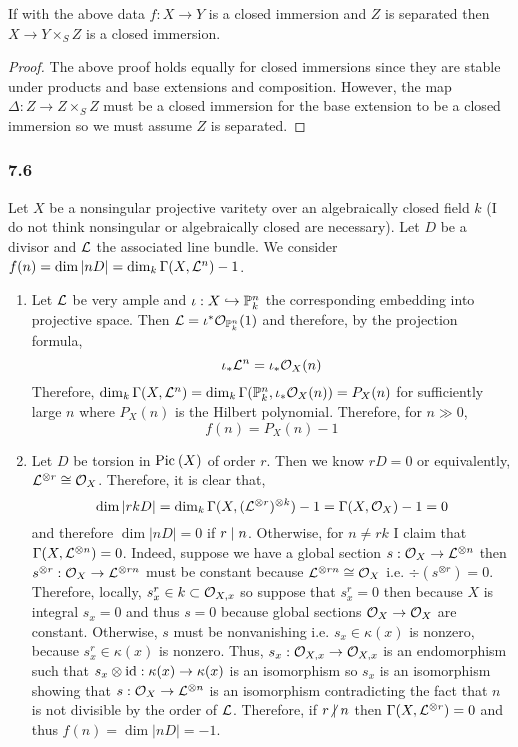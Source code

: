 \documentclass[12pt]{article}
\begin{document}
\begin{corollary}
If with the above data $f : X \to Y$ is a closed immersion and $Z$ is separated then $X \to Y \times_S Z$ is a closed immersion.
\end{corollary}

\begin{proof}
The above proof holds equally for closed immersions since they are stable under products and base extensions and composition. However, the map $\Delta : Z \to Z \times_S Z$ must be a closed immersion for the base extension to be a closed immersion so we must assume $Z$ is separated. 
\end{proof}

\subsubsection{7.6}

Let $X$ be a nonsingular projective varitety over an algebraically closed field $k$ (I do not think nonsingular or algebraically closed are necessary). Let $D$ be a divisor and $\mathcal{L}$ the associated line bundle. We consider $f(n) = \dim |n D| = \dim_k \Gamma(X, \mathcal{L}^n) - 1$.

\begin{enumerate}
\item Let $\mathcal{L}$ be very ample and $\iota : X \hookrightarrow \mathbb{P}^n_k$ the corresponding embedding into projective space. Then $\mathcal{L} = \iota^* \mathcal{O}_{\mathbb{P}^n_k}(1)$ and therefore, by the projection formula,
\[ \iota_* \mathcal{L}^n = \iota_* \mathcal{O}_{X}(n) \]
Therefore, $\dim_k \Gamma(X, \mathcal{L}^n) = \dim_k \Gamma(\mathbb{P}^n_k, \iota_* \mathcal{O}_{X}(n)) = P_X(n)$ for sufficiently large $n$ where $P_X(n)$ is the Hilbert polynomial. Therefore, for $n \gg 0$,
\[ f(n) = P_X(n) - 1 \]

\item Let $D$ be torsion in $\mathrm{Pic}^{} \left( X \right)$ of order $r$. Then we know $r D = 0$ or equivalently, $\mathcal{L}^{\otimes r} \cong \mathcal{O}_{X}$. Therefore, it is clear that,
\[ \dim |rkD| = \dim_k \Gamma(X, (\mathcal{L}^{\otimes r})^{\otimes k}) - 1 = \Gamma(X, \mathcal{O}_{X}) - 1 = 0 \]
and therefore $\dim |n D| = 0$ if $r \mid n$. Otherwise, for $n \neq rk$ I claim that $\Gamma(X, \mathcal{L}^{\otimes n}) = 0$. Indeed, suppose we have a global section $s : \mathcal{O}_{X} \to \mathcal{L}^{\otimes n}$ then $s^{\otimes r} : \mathcal{O}_{X} \to \mathcal{L}^{\otimes rn}$ must be constant because $\mathcal{L}^{\otimes rn} \cong \mathcal{O}_{X}$ i.e. $\div{(s^{\otimes r})} = 0$. Therefore, locally, $s^r_x \in k \subset \mathcal{O}_{X, x}$ so suppose that $s^r_x = 0$ then because $X$ is integral $s_x = 0$ and thus $s = 0$ because global sections $\mathcal{O}_{X} \to \mathcal{O}_{X}$ are constant. Otherwise, $s$ must be nonvanishing i.e. $s_x \in \kappa(x)$ is nonzero, because $s^r_x \in \kappa(x)$ is nonzero. Thus, $s_x : \mathcal{O}_{X, x} \to \mathcal{O}_{X, x}$ is an endomorphism such that $s_x \otimes \mathrm{id} : \kappa(x) \to \kappa(x)$ is an isomorphism so $s_x$ is an isomorphism showing that $s : \mathcal{O}_{X} \to \mathcal{L}^{\otimes n}$ is an isomorphism contradicting the fact that $n$ is not divisible by the order of $\mathcal{L}$. Therefore, if $r \ndivides n$ then $\Gamma(X, \mathcal{L}^{\otimes r}) = 0$ and thus $f(n) = \dim{|nD|} = -1$. 
\end{enumerate}
\end{document}
